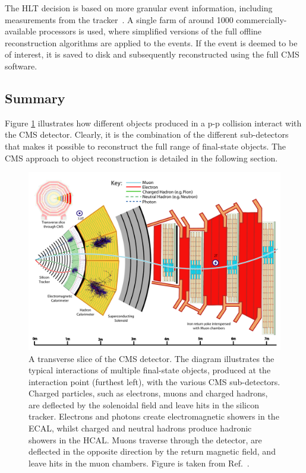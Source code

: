 The HLT decision is based on more granular event information, including measurements from the tracker~\cite{}. A single farm of around 1000 commercially-available processors is used, where simplified versions of the full offline reconstruction algorithms are applied to the events. If the event is deemed to be of interest, it is saved to disk and subsequently reconstructed using the full CMS software.

\subsection{Summary}
Figure \ref{fig:cms_interactions} illustrates how different objects produced in a p-p collision interact with the CMS detector. Clearly, it is the combination of the different sub-detectors that makes it possible to reconstruct the full range of final-state objects. The CMS approach to object reconstruction is detailed in the following section.

\begin{figure}[htb!]
  \centering
  \includegraphics[width=1\textwidth]{Figures/cms/CMS-PRF-14-001_Figure_001.pdf}
  \caption[Particle interactions in the CMS detector]
  {
    A transverse slice of the CMS detector. The diagram illustrates the typical interactions of multiple final-state objects, produced at the interaction point (furthest left), with the various CMS sub-detectors. Charged particles, such as electrons, muons and charged hadrons, are deflected by the solenoidal field and leave hits in the silicon tracker. Electrons and photons create electromagnetic showers in the ECAL, whilst charged and neutral hadrons produce hadronic showers in the HCAL. Muons traverse through the detector, are deflected in the opposite direction by the return magnetic field, and leave hits in the muon chambers. Figure is taken from Ref.~\cite{Sirunyan:2017ulk}.
  }
  \label{fig:cms_interactions}
\end{figure}

